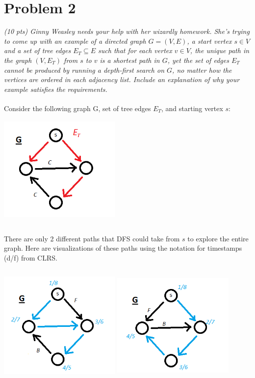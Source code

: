 \documentclass[12pt]{article} \setlength{\oddsidemargin}{0in}
\begin{document}
\newpage

\section*{Problem 2}

\textit{(10 pts) Ginny Weasley needs your help with her wizardly
  homework. She’s trying to come up with an example of a directed
  graph $G = (V, E)$, a start vertex $s \in V$ and a set of tree edges
  $E_T \subseteq E$ such that for each vertex $v \in V$, the unique path in the
  graph $(V, E_T)$ from $s$ to $v$ is a shortest path in $G$, yet the
  set of edges $E_T$ cannot be produced by running a depth-first
  search on $G$, no matter how the vertices are ordered in each
  adjacency list. Include an explanation of why your example satisfies
  the requirements.} \\\\
Consider the following graph G, set of tree edges $E_T$, and starting vertex $s$:\\
  \includegraphics[width=6cm,height=6cm]{2-G-ET}

  There are only 2 different paths that DFS could take from $s$ to explore the entire graph.
  Here are visualizations of these paths using the notation for timestamps (d/f) from CLRS.

  \includegraphics[width=6cm,height=6cm]{2-G-P1} \includegraphics[width=6cm,height=6cm]{2-G-P2} 
\end{document}
